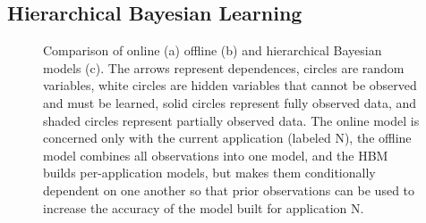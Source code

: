 \subsection{Hierarchical Bayesian Learning}

\begin{figure}

  \caption{ Comparison of online (a) offline (b) and hierarchical
    Bayesian models (c).  The arrows represent dependences, circles
    are random variables, white circles are hidden variables that
    cannot be observed and must be learned, solid circles represent
    fully observed data, and shaded circles represent partially
    observed data.  The online model is concerned only with the
    current application (labeled N), the offline model combines all
    observations into one model, and the HBM builds per-application
    models, but makes them conditionally dependent on one another so
    that prior observations can be used to increase the accuracy of
    the model built for application N.}
\label{fig:learning-models}
\end{figure}

